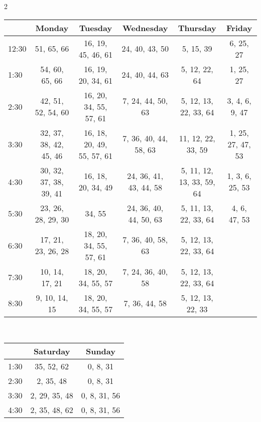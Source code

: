 \documentclass{article}
\begin{document}
\begin{multicols}{2}
\begin{table*}[ht]
\small
   \centering
   \begin{tabular}{ l | c | c | c | c | c }
      \textit& Monday & Tuesday & Wednesday & Thursday & Friday \\ \hline
      12:30 & 51, 65, 66 & 16, 19, 45, 46, 61 & 24, 40, 43, 50 & 5, 15, 39 & 6, 25, 27 \\
      1:30 & 54, 60, 65, 66 & 16, 19, 20, 34, 61 & 24, 40, 44, 63 & 5, 12, 22, 64 & 1, 25, 27 \\
      2:30 & 42, 51, 52, 54, 60 & 16, 20, 34, 55, 57, 61 & 7, 24, 44, 50, 63 & 5, 12, 13, 22, 33, 64 & 3, 4, 6, 9, 47 \\
      3:30 & 32, 37, 38, 42, 45, 46 & 16, 18, 20, 49, 55, 57, 61 & 7, 36, 40, 44, 58, 63 & 11, 12, 22, 33, 59 & 1, 25, 27, 47, 53 \\
      4:30 & 30, 32, 37, 38, 39, 41 & 16, 18, 20, 34, 49 & 24, 36, 41, 43, 44, 58 & 5, 11, 12, 13, 33, 59, 64 & 1, 3, 6, 25, 53 \\
      5:30 & 23, 26, 28, 29, 30 & 34, 55 & 24, 36, 40, 44, 50, 63 & 5, 11, 13, 22, 33, 64 & 4, 6, 47, 53 \\
      6:30 & 17, 21, 23, 26, 28 & 18, 20, 34, 55, 57, 61 & 7, 36, 40, 58, 63 & 5, 12, 13, 22, 33, 64 &  \\
      7:30 & 10, 14, 17, 21 & 18, 20, 34, 55, 57 & 7, 24, 36, 40, 58 & 5, 12, 13, 22, 33, 64 &  \\
      8:30 & 9, 10, 14, 15 & 18, 20, 34, 55, 57 & 7, 36, 44, 58 & 5, 12, 13, 22, 33 &  \\
   \end{tabular}
   \\[10pt]
   \centering
   \begin{tabular}{ l | c | c }   
      \textit & Saturday & Sunday \\ \hline
      1:30 & 35, 52, 62 & 0, 8, 31 \\
      2:30 & 2, 35, 48 & 0, 8, 31 \\
      3:30 & 2, 29, 35, 48 & 0, 8, 31, 56 \\
      4:30 & 2, 35, 48, 62 & 0, 8, 31, 56 \\
   \end{tabular}
   \\[10pt]
   \caption*{Time slot assignments for the sixty-seven TAs working during Autumn 2014. Each cell contains the TAs assigned to a given hour on a given day.}
\end{table*}
\end{multicols}
\end{document}
